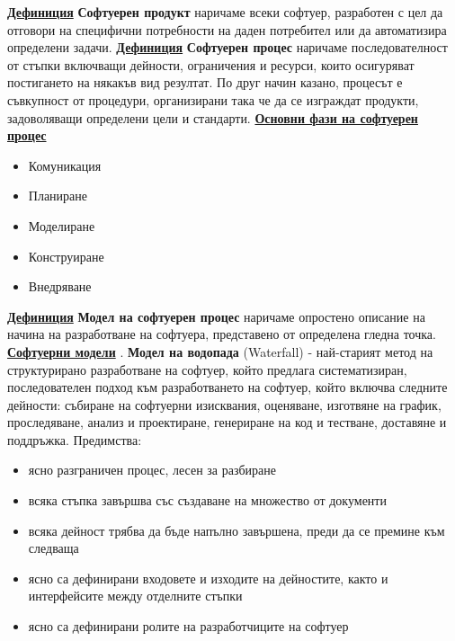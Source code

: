 \documentclass{article}
\begin{document}
\textbf{\underline{Дефиниция}}
\textbf{Софтуерен продукт} наричаме всеки софтуер, разработен с цел да отговори на специфични потребности на даден потребител или да
автоматизира определени задачи. \newline\newline
\textbf{\underline{Дефиниция}}
\textbf{Софтуерен процес} наричаме последователност от стъпки включващи дейности, ограничения и ресурси, които осигуряват
постигането на някакъв вид резултат. По друг начин казано, процесът е съвкупност от процедури, организирани така че да се
изграждат продукти, задоволяващи определени цели и стандарти. \newline\newline
\textbf{\underline{Основни фази на софтуерен процес}}
\begin{itemize}
    \item Комуникация
    \item Планиране
    \item Моделиране
    \item Конструиране
    \item Внедряване
\end{itemize}
\textbf{\underline{Дефиниция}}
\textbf{Модел на софтуерен процес} наричаме опростено описание на начина на разработване на софтуера, представено от определена
гледна точка. \newline\newline
\textbf{\underline{Софтуерни модели}} \newline{}. \textbf{Модел на водопада} (Waterfall) - най-старият метод на структурирано разработване на софтуер, който предлага систематизиран,
последователен подход към разработването на софтуер, който включва следните дейности: събиране на софтуерни изисквания,
оценяване, изготвяне на график, проследяване, анализ и проектиране, генериране на код и тестване, доставяне и поддръжка. \newline\newline
Предимства:
\begin{itemize}
    \item ясно разграничен процес, лесен за разбиране
    \item всяка стъпка завършва със създаване на множество от документи
    \item всяка дейност трябва да бъде напълно завършена, преди да се премине към следваща
    \item ясно са дефинирани входовете и изходите на дейностите, както и интерфейсите между отделните стъпки
    \item ясно са дефинирани ролите на разработчиците на софтуер
\end{itemize}
\end{document}
